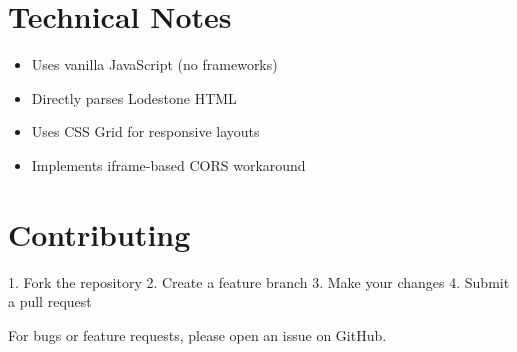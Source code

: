 \documentclass{article}
\begin{document}
\section{Technical Notes}
\begin{itemize}
    \item Uses vanilla JavaScript (no frameworks)
    \item Directly parses Lodestone HTML
    \item Uses CSS Grid for responsive layouts
    \item Implements iframe-based CORS workaround
\end{itemize}

\section{Contributing}
1. Fork the repository
2. Create a feature branch
3. Make your changes
4. Submit a pull request

For bugs or feature requests, please open an issue on GitHub.
\end{document}
